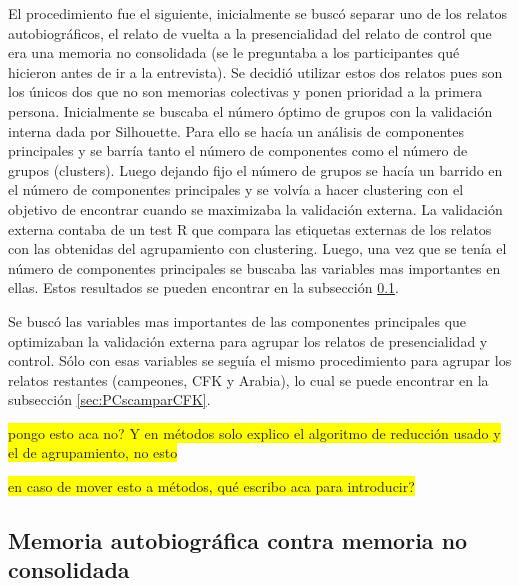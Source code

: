 El procedimiento fue el siguiente, inicialmente se buscó separar uno de los relatos autobiográficos, el relato de vuelta a la presencialidad del relato de control que era una memoria no consolidada (se le preguntaba a los participantes qué hicieron antes de ir a la entrevista). Se decidió utilizar estos dos relatos pues son los únicos dos que no son memorias colectivas y ponen prioridad a la primera persona. 
Inicialmente se buscaba el número óptimo de grupos con la validación interna dada por Silhouette. Para ello se hacía un análisis de componentes principales y se barría tanto el número de componentes como el número de grupos (clusters). Luego dejando fijo el número de grupos se hacía un barrido en el número de componentes principales y se volvía 
a hacer clustering con el objetivo de encontrar cuando se maximizaba la validación externa. La validación externa contaba de un test R que compara las etiquetas externas de los relatos con las obtenidas del agrupamiento con clustering. Luego, una vez que se tenía el número de componentes principales se buscaba las variables mas importantes en ellas. Estos resultados se pueden encontrar en la subsección \ref{sec:PCspresvscontrol}.

Se buscó las variables mas importantes de las componentes principales que optimizaban la validación externa para agrupar los relatos de presencialidad y control. Sólo con esas variables se seguía el mismo procedimiento para agrupar los relatos restantes (campeones, CFK y Arabia), lo cual se puede encontrar en la subsección \ref{sec:PCscamparCFK}.

\colorbox{yellow}{pongo esto aca no? Y en métodos solo explico el algoritmo de reducción usado y el de agrupamiento, no esto}

\colorbox{yellow}{en caso de mover esto a métodos, qué escribo aca para introducir?}


\subsection{Memoria autobiográfica contra memoria no consolidada}
\label{sec:PCspresvscontrol}

